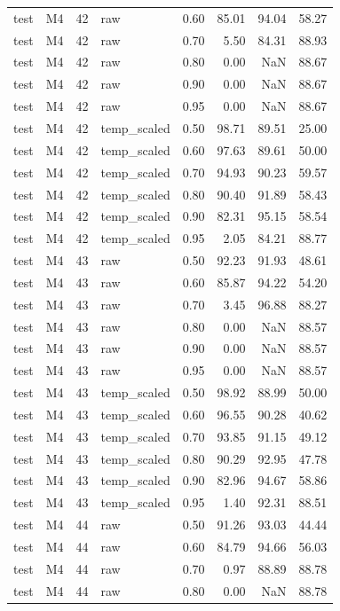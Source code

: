 \begin{tabular}{llrlrrrr}
test & M4 & 42 & raw & 0.60 & 85.01 & 94.04 & 58.27 \\
test & M4 & 42 & raw & 0.70 & 5.50 & 84.31 & 88.93 \\
test & M4 & 42 & raw & 0.80 & 0.00 & NaN & 88.67 \\
test & M4 & 42 & raw & 0.90 & 0.00 & NaN & 88.67 \\
test & M4 & 42 & raw & 0.95 & 0.00 & NaN & 88.67 \\
test & M4 & 42 & temp\_scaled & 0.50 & 98.71 & 89.51 & 25.00 \\
test & M4 & 42 & temp\_scaled & 0.60 & 97.63 & 89.61 & 50.00 \\
test & M4 & 42 & temp\_scaled & 0.70 & 94.93 & 90.23 & 59.57 \\
test & M4 & 42 & temp\_scaled & 0.80 & 90.40 & 91.89 & 58.43 \\
test & M4 & 42 & temp\_scaled & 0.90 & 82.31 & 95.15 & 58.54 \\
test & M4 & 42 & temp\_scaled & 0.95 & 2.05 & 84.21 & 88.77 \\
test & M4 & 43 & raw & 0.50 & 92.23 & 91.93 & 48.61 \\
test & M4 & 43 & raw & 0.60 & 85.87 & 94.22 & 54.20 \\
test & M4 & 43 & raw & 0.70 & 3.45 & 96.88 & 88.27 \\
test & M4 & 43 & raw & 0.80 & 0.00 & NaN & 88.57 \\
test & M4 & 43 & raw & 0.90 & 0.00 & NaN & 88.57 \\
test & M4 & 43 & raw & 0.95 & 0.00 & NaN & 88.57 \\
test & M4 & 43 & temp\_scaled & 0.50 & 98.92 & 88.99 & 50.00 \\
test & M4 & 43 & temp\_scaled & 0.60 & 96.55 & 90.28 & 40.62 \\
test & M4 & 43 & temp\_scaled & 0.70 & 93.85 & 91.15 & 49.12 \\
test & M4 & 43 & temp\_scaled & 0.80 & 90.29 & 92.95 & 47.78 \\
test & M4 & 43 & temp\_scaled & 0.90 & 82.96 & 94.67 & 58.86 \\
test & M4 & 43 & temp\_scaled & 0.95 & 1.40 & 92.31 & 88.51 \\
test & M4 & 44 & raw & 0.50 & 91.26 & 93.03 & 44.44 \\
test & M4 & 44 & raw & 0.60 & 84.79 & 94.66 & 56.03 \\
test & M4 & 44 & raw & 0.70 & 0.97 & 88.89 & 88.78 \\
test & M4 & 44 & raw & 0.80 & 0.00 & NaN & 88.78 \\

\end{tabular}
